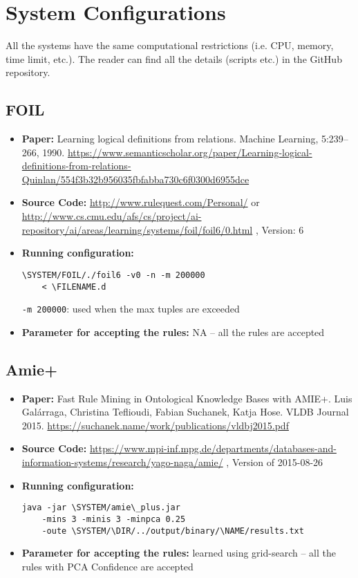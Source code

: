 \documentclass[letterpaper]{article} \usepackage{aaai20}  \usepackage{times}  \usepackage{helvet} \usepackage{courier}  \usepackage[hyphens]{url}  \usepackage{graphicx} \urlstyle{rm} \def\UrlFont{\rm}  \usepackage{graphicx}  \frenchspacing  \setlength{\pdfpagewidth}{8.5in}  \setlength{\pdfpageheight}{11in}  \usepackage{amsthm}
\theoremstyle{definition}
\newcommand{\tool}{\text{RuDaS}\xspace}
\begin{document}
\clearpage
\newpage
\appendix 
\setcounter{secnumdepth}{1}

\section{System Configurations}
All the systems have the same computational restrictions (i.e. CPU, memory, time limit, etc.). The reader can find all the details (scripts etc.) in the \tool GitHub repository.


\subsection{FOIL}
\begin{itemize}
\item {\bf Paper:} Learning logical definitions from relations. Machine Learning, 5:239–266, 1990. \url{https://www.semanticscholar.org/paper/Learning-logical-definitions-from-relations-Quinlan/554f3b32b956035fbfabba730c6f0300d6955dce}
\item {\bf Source Code:} \url{http://www.rulequest.com/Personal/} or \url{http://www.cs.cmu.edu/afs/cs/project/ai-repository/ai/areas/learning/systems/foil/foil6/0.html} ,
Version: 6
\item {\bf Running configuration:}
\begin{lstlisting}[basicstyle=\ttfamily\scriptsize,showstringspaces=false]
 \SYSTEM/FOIL/./foil6 -v0 -n -m 200000
    < \FILENAME.d
 \end{lstlisting}
\texttt{-m 200000}: used when the max tuples are exceeded
\item {\bf Parameter for accepting the rules:} NA -- all the rules are accepted
\end{itemize}

\subsection{Amie+}
\begin{itemize}
\item {\bf Paper:} Fast Rule Mining in Ontological Knowledge Bases with AMIE+. Luis Galárraga, Christina Teflioudi, Fabian Suchanek, Katja Hose. VLDB Journal 2015. 
\url{https://suchanek.name/work/publications/vldbj2015.pdf}
\item {\bf Source Code:} \url{https://www.mpi-inf.mpg.de/departments/databases-and-information-systems/research/yago-naga/amie/} , Version of 2015-08-26
\item {\bf Running configuration:}
\begin{lstlisting}[basicstyle=\ttfamily\scriptsize,showstringspaces=false]
java -jar \SYSTEM/amie\_plus.jar 
    -mins 3 -minis 3 -minpca 0.25 
    -oute \SYSTEM/\DIR/../output/binary/\NAME/results.txt
\end{lstlisting}
\item {\bf Parameter for accepting the rules:} learned using grid-search  -- all the rules with PCA Confidence  are accepted
\end{itemize}
\end{document}
